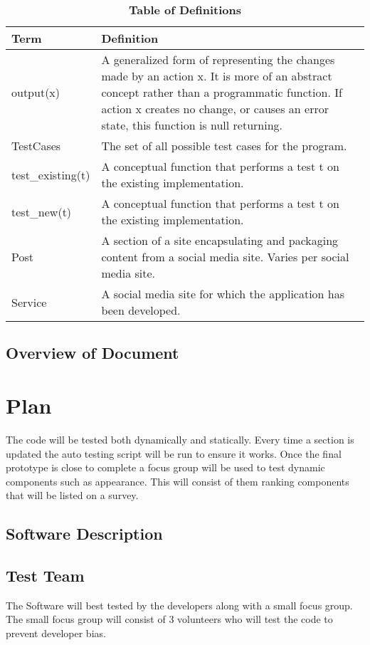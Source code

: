 \documentclass[12pt, titlepage]{article}
\begin{document}
\begin{table}[!htb]
\caption{\textbf{Table of Definitions}} \label{Table}
\begin{tabularx}{\textwidth}{p{3cm}X}
\toprule
\textbf{Term} & \textbf{Definition}\\
\midrule
output(x) & A generalized form of representing the changes made by an action x. It is more of an abstract concept rather than a programmatic function. If action x creates no change, or causes an error state, this function is null returning.\\
TestCases & The set of all possible test cases for the program. \\
test\_existing(t) & A conceptual function that performs a test t on the existing implementation. \\
test\_new(t) & A conceptual function that performs a test t on the existing implementation. \\
Post & A section of a site encapsulating and packaging content from a social media site. Varies per social media site. \\
Service & A social media site for which the application has been developed. \\
\bottomrule
\end{tabularx}
\end{table}	

\subsection{Overview of Document}
\section{Plan}
The code will be tested both dynamically and statically. Every time a section is updated the auto testing script will be run to ensure it works. Once the final prototype is close to complete a focus group will be used to test dynamic components such as appearance. This will consist of them ranking components that will be listed on a survey.	
\subsection{Software Description}
\subsection{Test Team}
The Software will best tested by the developers along with a small focus group. The small focus group will consist of 3 volunteers who will test the code to prevent developer bias. 
\end{document}
